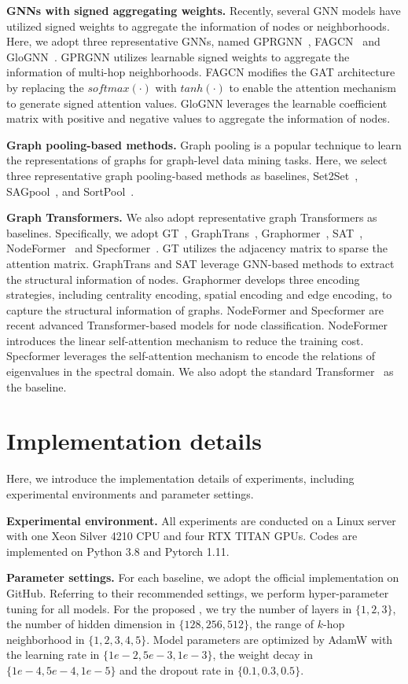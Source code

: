 \documentclass[sigconf, screen]{acmart}
\begin{document}
\textbf{GNNs with signed aggregating weights.}
Recently, several GNN models have utilized signed weights to aggregate the information of nodes or neighborhoods.
Here, we adopt three representative GNNs, named GPRGNN~\cite{gprgnn}, FAGCN~\cite{fagcn} and GloGNN~\cite{glognn}.
GPRGNN utilizes learnable signed weights to aggregate the information of multi-hop neighborhoods.
FAGCN modifies the GAT architecture by replacing the $\mathit{softmax}(\cdot)$ with $\mathit{tanh}(\cdot)$ to enable the attention mechanism to generate signed attention values.
GloGNN leverages the learnable coefficient matrix with positive and negative values to aggregate the information of nodes.

\textbf{Graph pooling-based methods.}
Graph pooling is a popular technique to learn the representations of graphs for graph-level data mining tasks.
Here, we select three representative graph pooling-based methods as baselines, Set2Set~\cite{set2set}, SAGpool~\cite{sagpool}, and SortPool~\cite{sortpool}.

\textbf{Graph Transformers.}
We also adopt representative graph Transformers as baselines.
Specifically, we adopt GT~\cite{gt}, GraphTrans~\cite{graphtrans}, Graphormer~\cite{graphormer}, SAT~\cite{sat}, NodeFormer~\cite{nodeformer} and Specformer~\cite{specformer}.
GT utilizes the adjacency matrix to sparse the attention matrix.
GraphTrans and SAT leverage GNN-based methods to extract the structural information of nodes.
Graphormer develops three encoding strategies, including centrality encoding, spatial encoding and edge encoding, to capture the structural information of graphs.
NodeFormer and Specformer are recent advanced Transformer-based models for node classification.
NodeFormer introduces the linear self-attention mechanism to reduce the training cost.
Specformer leverages the self-attention mechanism to encode the relations of eigenvalues in the spectral domain. 
We also adopt the standard Transformer~\cite{transformer} as the baseline. 


\section{Implementation details}\label{app_para}
Here, we introduce the implementation details of experiments, including experimental environments and parameter settings.

\textbf{Experimental environment.}
All experiments are conducted on a Linux server with one Xeon Silver 4210 CPU and four RTX TITAN GPUs. 
Codes are implemented on Python 3.8 and Pytorch 1.11.

\textbf{Parameter settings.}
For each baseline, we adopt the official implementation on GitHub.
Referring to their recommended settings, we perform hyper-parameter tuning for all models.
For the proposed \name, we try the number of layers in $\{1,2,3\}$, the number of hidden dimension in $\{128, 256, 512\}$, the range of $k$-hop neighborhood in $\{1,2,3,4,5\}$.
Model parameters are optimized by AdamW \cite{adamw} with the learning rate in $\{1e-2,5e-3,1e-3\}$, the weight decay in $\{1e-4,5e-4,1e-5\}$ and the dropout rate in $\{0.1,0.3,0.5\}$.
 
\end{document}
